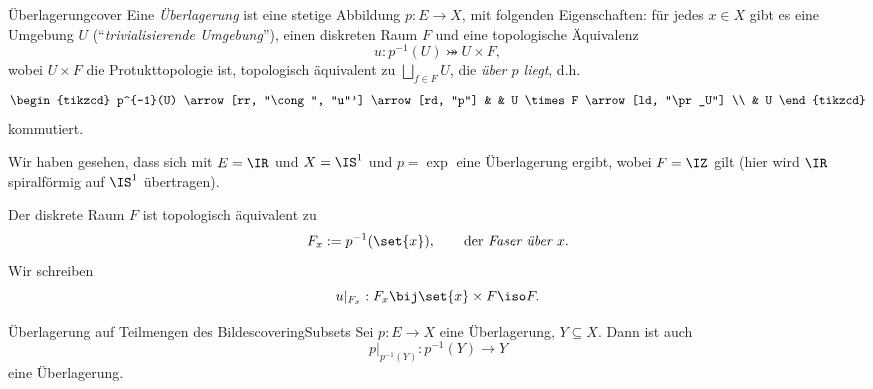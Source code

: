 \documentclass[language=ngerman]{TemplateLecture} %
\begin{document}

\begin{defi}{Überlagerung}{cover}
    Eine \emph{Überlagerung} ist eine stetige Abbildung $p: E \to X$, mit folgenden Eigenschaften: für jedes $x \in X$ gibt es eine Umgebung $U$ (\enquote{\emph{trivialisierende Umgebung}}), einen diskreten Raum $F$ und eine topologische Äquivalenz
    \begin{equation*}
        u: p^{-1}(U) \bij U \times F,
    \end{equation*}
    wobei $U \times F$ die Protukttopologie ist, topologisch äquivalent zu $\bigsqcup_{f \in F} U$, die \emph{über $p$ liegt}, d.h.
    \begin{equation*}
        \begin{tikzcd}
            p^{-1}(U) \arrow[rr, "\cong", "u"'] \arrow[rd, "p"] & & U \times F \arrow[ld, "\pr_U"] \\ 
             & U
        \end{tikzcd}
    \end{equation*}
    kommutiert.
\end{defi}

\begin{example}
    Wir haben gesehen, dass sich mit $E = \IR$ und $X = \IS^1$ und $p = \exp$ eine Überlagerung ergibt, wobei $F = \IZ$ gilt (hier wird $\IR$ spiralförmig auf $\IS^1$ übertragen).
\end{example}

\begin{remark}
    Der diskrete Raum $F$ ist topologisch äquivalent zu 
    \begin{equation*}
        F_x := p^{-1}(\set{x}), \quad \quad \text{der \emph{Faser über $x$}}.
    \end{equation*}
    Wir schreiben 
    \begin{equation*}
        u|_{F_x}: F_x \bij \set{x} \times F \iso F.
    \end{equation*}
\end{remark}

\begin{lem}{Überlagerung auf Teilmengen des Bildes}{coveringSubsets}
    Sei $p: E \to X$ eine Überlagerung, $Y \subseteq X$. Dann ist auch 
    \begin{equation*}
        p|_{p^{-1}(Y)}: p^{-1}(Y) \to Y
    \end{equation*}
    eine Überlagerung.
\end{lem}
\end{document}

